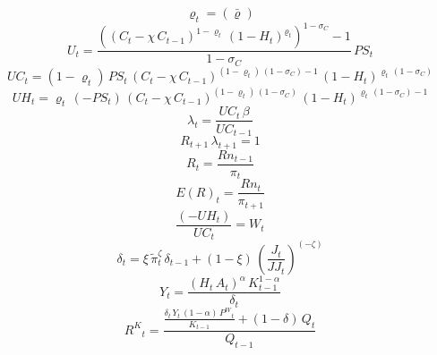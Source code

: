 \begin{dmath}
{{\varrho}}_{t}=(\bar{{\varrho}})
\end{dmath}
\begin{dmath}
{U}_{t}=\frac{\left(\left({C}_{t}-{{\chi}}\, {C}_{t-1}\right)^{1-{{\varrho}}_{t}}\, \left(1-{H}_{t}\right)^{{{\varrho}}_{t}}\right)^{1-{{\sigma_{C}}}}-1}{1-{{\sigma_{C}}}}\, {PS}_{t}
\end{dmath}
\begin{dmath}
{UC}_{t}=\left(1-{{\varrho}}_{t}\right)\, {PS}_{t}\, \left({C}_{t}-{{\chi}}\, {C}_{t-1}\right)^{\left(1-{{\varrho}}_{t}\right)\, \left(1-{{\sigma_{C}}}\right)-1}\, \left(1-{H}_{t}\right)^{{{\varrho}}_{t}\, \left(1-{{\sigma_{C}}}\right)}
\end{dmath}
\begin{dmath}
{UH}_{t}={{\varrho}}_{t}\, \left(-{PS}_{t}\right)\, \left({C}_{t}-{{\chi}}\, {C}_{t-1}\right)^{\left(1-{{\varrho}}_{t}\right)\, \left(1-{{\sigma_{C}}}\right)}\, \left(1-{H}_{t}\right)^{{{\varrho}}_{t}\, \left(1-{{\sigma_{C}}}\right)-1}
\end{dmath}
\begin{dmath}
{\lambda}_{t}=\frac{{UC}_{t}\, {{\beta}}}{{UC}_{t-1}}
\end{dmath}
\begin{dmath}
{R}_{t+1}\, {\lambda}_{t+1}=1
\end{dmath}
\begin{dmath}
{R}_{t}=\frac{{Rn}_{t-1}}{{\pi}_{t}}
\end{dmath}
\begin{dmath}
{E(R)}_{t}=\frac{{Rn}_{t}}{{\pi}_{t+1}}
\end{dmath}
\begin{dmath}
\frac{\left(-{UH}_{t}\right)}{{UC}_{t}}={W}_{t}
\end{dmath}
\begin{dmath}
{\delta}_{t}={{\xi}}\, {\tilde{\pi}}_{t}^{{{\zeta}}}\, {\delta}_{t-1}+\left(1-{{\xi}}\right)\, \left(\frac{{J}_{t}}{{JJ}_{t}}\right)^{\left(-{{\zeta}}\right)}
\end{dmath}
\begin{dmath}
{Y}_{t}=\frac{\left({H}_{t}\, {A}_{t}\right)^{{{\alpha}}}\, {K}_{t-1}^{1-{{\alpha}}}}{{\delta}_{t}}
\end{dmath}
\begin{dmath}
{R^{K}}_{t}=\frac{\frac{{\delta}_{t}\, {Y}_{t}\, \left(1-{{\alpha}}\right)\, {P^{W}}_{t}}{{K}_{t-1}}+\left(1-{{\delta}}\right)\, {Q}_{t}}{{Q}_{t-1}}
\end{dmath}

